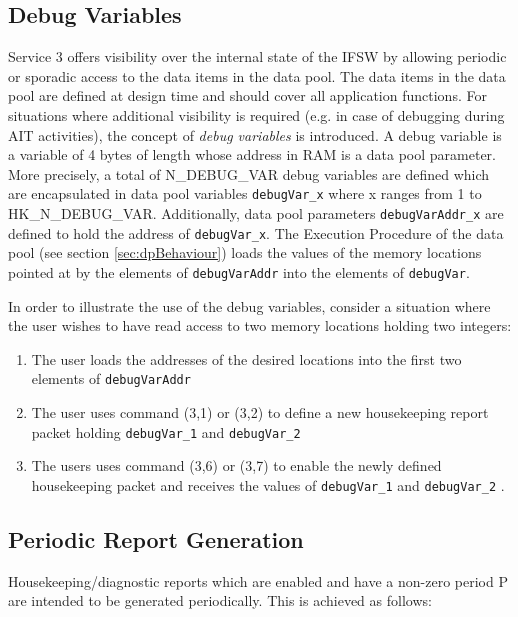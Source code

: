 \documentclass{pnp_article}
\begin{document}
\subsection{Debug Variables}\label{sec:debugVar}
Service 3 offers visibility over the internal state of the IFSW by allowing periodic or sporadic access to the data items in the data pool. The data items in the data pool are defined at design time and should cover all application functions. For situations where additional visibility is required (e.g. in case of debugging during AIT activities), the concept of \textit{debug variables} is introduced. A debug variable is a variable of 4 bytes of length whose address in RAM is a data pool parameter. More precisely, a total of N\_DEBUG\_VAR debug variables are defined which are encapsulated in data pool variables \texttt{debugVar\_x} where x ranges from 1 to HK\_N\_DEBUG\_VAR. Additionally, data pool parameters \texttt{debugVarAddr\_x} are defined to hold the address of \texttt{debugVar\_x}. The Execution Procedure of the data pool (see section \ref{sec:dpBehaviour}) loads the values of the memory locations pointed at by the elements of \texttt{debugVarAddr} into the elements of \texttt{debugVar}.  

In order to illustrate the use of the debug variables, consider a situation where the user wishes to have read access to two memory locations holding two integers: 

\begin{enumerate}
\item The user loads the addresses of the desired locations into the first two elements of \texttt{debugVarAddr}
\item The user uses command (3,1) or (3,2) to define a new housekeeping report packet holding \texttt{debugVar\_1} and \texttt{debugVar\_2} 
\item The users uses command (3,6) or (3,7) to enable the newly defined housekeeping packet and receives the values of \texttt{debugVar\_1} and \texttt{debugVar\_2} .
\end{enumerate}

\subsection{Periodic Report Generation}\label{sec:perRepGen}
Housekeeping/diagnostic reports which are enabled and have a non-zero period P are intended to be generated periodically. This is achieved as follows:
\end{document}
